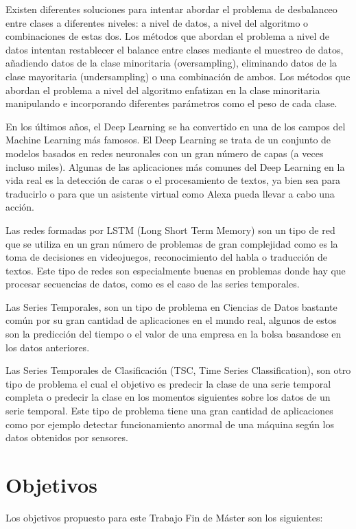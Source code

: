 Existen diferentes soluciones para intentar abordar el problema de desbalanceo entre clases a diferentes niveles: a nivel de datos, a nivel del algoritmo o combinaciones de estas dos. Los métodos que abordan el problema a nivel de datos intentan restablecer el balance entre clases mediante el muestreo de datos, añadiendo datos de la clase minoritaria (oversampling), eliminando datos de la clase mayoritaria (undersampling) o una combinación de ambos. Los métodos que abordan el problema a nivel del algoritmo enfatizan en la clase minoritaria manipulando e incorporando diferentes parámetros como el peso de cada clase.\newline

En los últimos años, el Deep Learning se ha convertido en una de los campos del Machine Learning más famosos. El Deep Learning se trata de un conjunto de modelos basados en redes neuronales con un gran número de capas (a veces incluso miles). Algunas de las aplicaciones más comunes del Deep Learning en la vida real es la detección de caras o el procesamiento de textos, ya bien sea para traducirlo o para que un asistente virtual como Alexa pueda llevar a cabo una acción.\newline

Las redes formadas por LSTM (Long Short Term Memory) son un tipo de red que se utiliza en un gran número de problemas de gran complejidad como es la toma de decisiones en videojuegos, reconocimiento del habla o traducción de textos. Este tipo de redes son especialmente buenas en problemas donde hay que procesar secuencias de datos, como  es el caso de las series temporales.\newline

Las Series Temporales, son un tipo de problema en Ciencias de Datos bastante común por su gran cantidad de aplicaciones en el mundo real, algunos de estos son la predicción del tiempo o el valor de una empresa en la bolsa basandose en los datos anteriores.\newline

Las Series Temporales de Clasificación (TSC, Time Series Classification), son otro tipo de problema el cual el objetivo es predecir la clase de una serie temporal completa o predecir la clase en los momentos siguientes sobre los datos de un serie temporal. Este tipo de problema tiene una gran cantidad de aplicaciones como por ejemplo detectar funcionamiento anormal de una máquina según los datos obtenidos por sensores.\newline
\newpage
\section{Objetivos}
Los objetivos propuesto para este Trabajo Fin de Máster son los siguientes:

